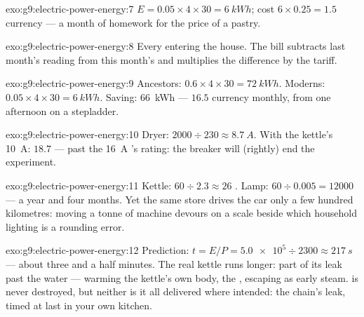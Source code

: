 \begin{solution}{exo:g9:electric-power-energy:7}
$E = 0.05 \times 4 \times 30 = \qty{6}{kWh}$; cost $6 \times
0.25 = 1.5$ currency  --- a month of homework for the
price of a pastry.
\end{solution}

\begin{solution}{exo:g9:electric-power-energy:8}
Every  entering the house. The bill subtracts
last month's reading from this month's and multiplies the
difference by the tariff.
\end{solution}

\begin{solution}{exo:g9:electric-power-energy:9}
Ancestors: $0.6 \times 4 \times 30 = \qty{72}{kWh}$.
Moderns: $0.05 \times 4 \times 30 = \qty{6}{kWh}$. Saving:
\qty{66}{kWh} --- $16.5$ currency  monthly, from one
afternoon on a stepladder.
\end{solution}

\begin{solution}{exo:g9:electric-power-energy:10}
Dryer: $2000 \div 230 \approx \qty{8.7}{A}$. With the
kettle's \qty{10}{A}: $18.7$ --- past the \qty{16}{A}
's rating: the breaker will (rightly) end the
experiment.
\end{solution}

\begin{solution}{exo:g9:electric-power-energy:11}
Kettle: $60 \div 2.3 \approx 26$ . Lamp: $60 \div
0.005 = 12000$  --- a year and four months. Yet the
same store drives the car only a few hundred kilometres:
moving a tonne of machine devours  on a scale beside
which household lighting is a rounding error.
\end{solution}

\begin{solution}{exo:g9:electric-power-energy:12}
Prediction: $t = E/P = \num{5.0e5} \div 2300 \approx
\qty{217}{s}$ --- about three and a half minutes. The real
kettle runs longer: part of its  leak past the water
--- warming the kettle's own body, the , escaping as
early steam.  is never destroyed, but neither is it
all delivered where intended: the chain's leak, timed at
last in your own kitchen.
\end{solution}

